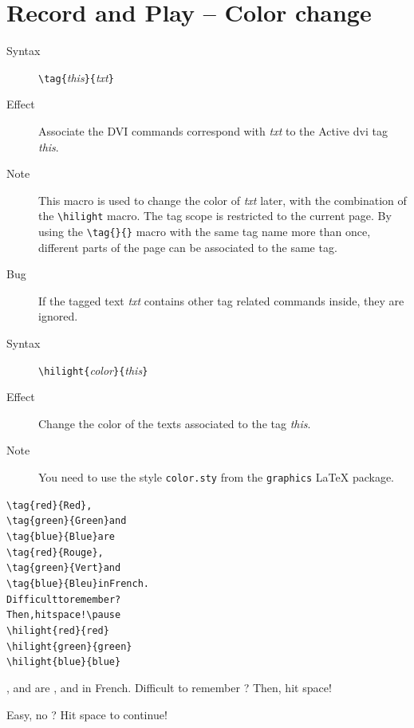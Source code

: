 \documentclass{article}
\begin{document}
\section{Record and Play -- Color change}

\begin{description}
\item[Syntax]  \verb!\tag{!{\em{this}}\verb!}{!{\em{txt}}\verb!}!
\item[Effect] Associate the DVI commands correspond with {\em{txt}} to
  the Active dvi tag {\em{this}}.
\item[Note] This macro is used to change the color of {\em{txt}}
  later, with the combination of the \verb!\hilight! macro.
  The tag scope is restricted to the current page.
  By using the \verb!\tag{}{}! macro with the same tag name more than once,
  different parts of the page can be associated to the same tag.
\item[Bug] If the tagged text {\em{txt}} contains other tag related
 commands inside, they are ignored.
\end{description}

\begin{description}
\item[Syntax]  \verb!\hilight{!{\em{color}}\verb!}{!{\em{this}}\verb!}!
\item[Effect] Change the color of the texts associated to the tag {\em{this}}.
\item[Note] You need to use the style \verb!color.sty! from the
\verb"graphics" LaTeX package.
\end{description}

\begin{minipage}[t]{0.5\textwidth}
\begin{alltt}
{\color{blue}\verb!\tag{red}{Red}!}, 
{\color{blue}\verb!\tag{green}{Green}!} and 
{\color{blue}\verb!\tag{blue}{Blue}!} are
{\color{blue}\verb!\tag{red}{Rouge}!}, 
{\color{blue}\verb!\tag{green}{Vert}!} and 
{\color{blue}\verb!\tag{blue}{Bleu}!} in French.
Difficult to remember ?
Then, hit space!\verb!\pause!
{\color{blue}\verb!\hilight{red}{red}!}
{\color{blue}\verb!\hilight{green}{green}!}
{\color{blue}\verb!\hilight{blue}{blue}!}
\end{alltt}
\end{minipage}
\begin{minipage}[t]{0.5\textwidth}
, 
 and 
 are
, 
 and 
 in French.
Difficult to remember ? 
Then, hit space!\pause
{}
\end{minipage}
\noindent
Easy, no ? Hit space to continue!\pause
\end{document}
